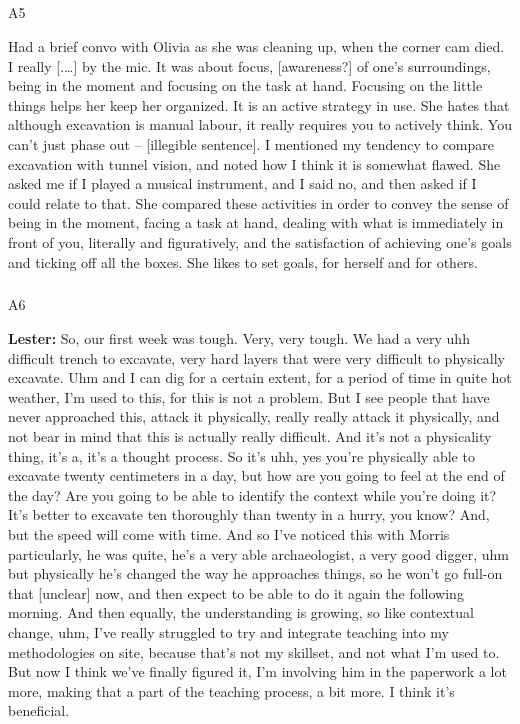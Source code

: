 \documentclass[
]{article}
\makeatletter
\let\oldsubparagraph\subparagraph
\renewcommand{\subparagraph}{
    \@ifstar
      \xxxSubParagraphStar
      \xxxSubParagraphNoStar
  }
\newcommand{\xxxSubParagraphStar}[1]{\oldsubparagraph*{#1}\mbox{}}
\newcommand{\xxxSubParagraphNoStar}[1]{\oldsubparagraph{#1}\mbox{}}
\makeatother
\begin{document}
\subparagraph{A5}\label{sec-A5}

Had a brief convo with Olivia as she was cleaning up, when the corner
cam died. I really {[}.\ldots{]} by the mic. It was about focus,
{[}awareness?{]} of one's surroundings, being in the moment and focusing
on the task at hand. Focusing on the little things helps her keep her
organized. It is an active strategy in use. She hates that although
excavation is manual labour, it really requires you to actively think.
You can't just phase out -- {[}illegible sentence{]}. I mentioned my
tendency to compare excavation with tunnel vision, and noted how I think
it is somewhat flawed. She asked me if I played a musical instrument,
and I said no, and then asked if I could relate to that. She compared
these activities in order to convey the sense of being in the moment,
facing a task at hand, dealing with what is immediately in front of you,
literally and figuratively, and the satisfaction of achieving one's
goals and ticking off all the boxes. She likes to set goals, for herself
and for others.

\subparagraph{A6}\label{sec-A6}

\textbf{Lester:} So, our first week was tough. Very, very tough. We had
a very uhh difficult trench to excavate, very hard layers that were very
difficult to physically excavate. Uhm and I can dig for a certain
extent, for a period of time in quite hot weather, I'm used to this, for
this is not a problem. But I see people that have never approached this,
attack it physically, really really attack it physically, and not bear
in mind that this is actually really difficult. And it's not a
physicality thing, it's a, it's a thought process. So it's uhh, yes
you're physically able to excavate twenty centimeters in a day, but how
are you going to feel at the end of the day? Are you going to be able to
identify the context while you're doing it? It's better to excavate ten
thoroughly than twenty in a hurry, you know? And, but the speed will
come with time. And so I've noticed this with Morris particularly, he
was quite, he's a very able archaeologist, a very good digger, uhm but
physically he's changed the way he approaches things, so he won't go
full-on that {[}unclear{]} now, and then expect to be able to do it
again the following morning. And then equally, the understanding is
growing, so like contextual change, uhm, I've really struggled to try
and integrate teaching into my methodologies on site, because that's not
my skillset, and not what I'm used to. But now I think we've finally
figured it, I'm involving him in the paperwork a lot more, making that a
part of the teaching process, a bit more. I think it's beneficial.
\end{document}
